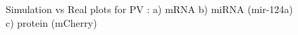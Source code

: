 \documentclass{article}
\begin{document}
\begin{figure}[h!]
\caption{Simulation vs Real plots for PV : a) mRNA b) miRNA (mir-124a) c) protein (mCherry)}
\label{resultsPV}
\end{figure}

\begin{figure}[h!]
\centering
{}

\end{figure}
\end{document}

